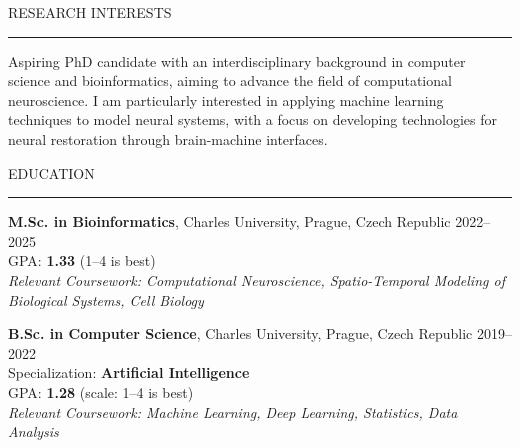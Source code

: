 \documentclass{resume} %
\renewenvironment{rSection}[1]{
\sectionskip
\textcolor{CarnegieMellonRed}{\MakeUppercase{#1}}
\sectionlineskip
\hrule
\begin{list}{}{
\setlength{\leftmargin}{1.5em}
}
\item[]
}{
\end{list}
}
\begin{document}
\begin{rSection}{Research Interests}
    Aspiring PhD candidate with an interdisciplinary background in computer science and bioinformatics, aiming to advance the field of computational neuroscience. I am particularly interested in applying machine learning techniques to model neural systems, with a focus on developing technologies for neural restoration through brain-machine interfaces.
\end{rSection}

\begin{rSection}{Education}

{\bf \large M.Sc. in Bioinformatics}, Charles University, Prague, Czech Republic \hfill {2022--2025} \\ 
GPA: \textbf{1.33} (1--4 \vline {} is best)  \hfill \\
{\em Relevant Coursework: Computational Neuroscience, Spatio-Temporal Modeling of Biological Systems, Cell Biology}

{\bf \large B.Sc. in Computer Science}, Charles University, Prague, Czech Republic \hfill {2019--2022} \\
Specialization: \textbf{Artificial Intelligence} \\
GPA: \textbf{1.28} (scale: 1--4 \vline {} is best) \\
{\em Relevant Coursework: Machine Learning, Deep Learning, Statistics, Data Analysis}

\end{rSection}
\end{document}
